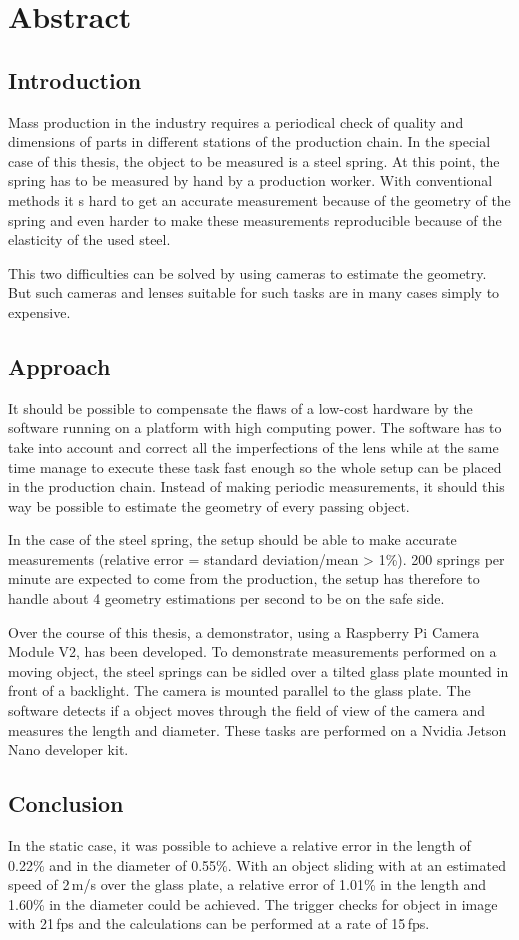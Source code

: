 \chapter*{Abstract}

\section*{Introduction}
Mass production in the industry requires a periodical check of quality and dimensions of parts in different stations of the production chain.
In the special case of this thesis, the object to be measured is a steel spring.
At this point, the spring has to be measured by hand by a production worker.
With conventional methods it s hard to get an accurate measurement because of the geometry of the spring and even harder to make these measurements reproducible because of the elasticity of the used steel.

This two difficulties can be solved by using cameras to estimate the geometry.
But such cameras and lenses suitable for such tasks are in many cases simply to expensive.

\section*{Approach}
It should be possible to compensate the flaws of a low-cost hardware by the software running on a platform with high computing power.
The software has to take into account and correct all the imperfections of the lens while at the same time manage to execute these task fast enough so the whole setup can be placed in the production chain.
Instead of making periodic measurements, it should this way be possible to estimate the geometry of every passing object.

In the case of the steel spring, the setup should be able to make accurate measurements (relative error = standard deviation/mean > 1\%).
200 springs per minute are expected to come from the production, the setup has therefore to handle about 4 geometry estimations per second to be on the safe side.

Over the course of this thesis, a demonstrator, using a Raspberry Pi Camera Module V2, has been developed.
To demonstrate measurements performed on a moving object, the steel springs can be sidled over a tilted glass plate mounted in front of a backlight.
The camera is mounted parallel to the glass plate.
The software detects if a object moves through the field of view of the camera and measures the length and diameter.
These tasks are performed on a Nvidia Jetson Nano developer kit.

\section*{Conclusion}
In the static case, it was possible to achieve a relative error in the length of 0.22\% and in the diameter of 0.55\%.
With an object sliding with at an estimated speed of 2\,m/s over the glass plate, a relative error of 1.01\% in the length and 1.60\% in the diameter could be achieved.
The trigger checks for object in image with 21\,fps and the calculations can be performed at a rate of 15\,fps.
